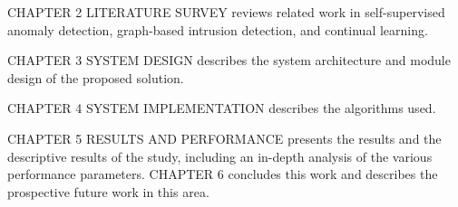 \vspace{0.6em}
CHAPTER 2 LITERATURE SURVEY reviews related work in self-supervised anomaly
detection, graph-based intrusion detection, and continual learning.

\vspace{0.6em}
CHAPTER 3 SYSTEM DESIGN describes the system architecture and module design of
the proposed solution.

\vspace{0.6em}
CHAPTER 4 SYSTEM IMPLEMENTATION describes the algorithms used.

\vspace{0.6em}
CHAPTER 5 RESULTS AND PERFORMANCE presents the results and the descriptive results of the study, including
an in-depth analysis of the various performance parameters.
\newline
\vspace{0.6em}
CHAPTER 6 concludes this work and describes the prospective future work in this area.
